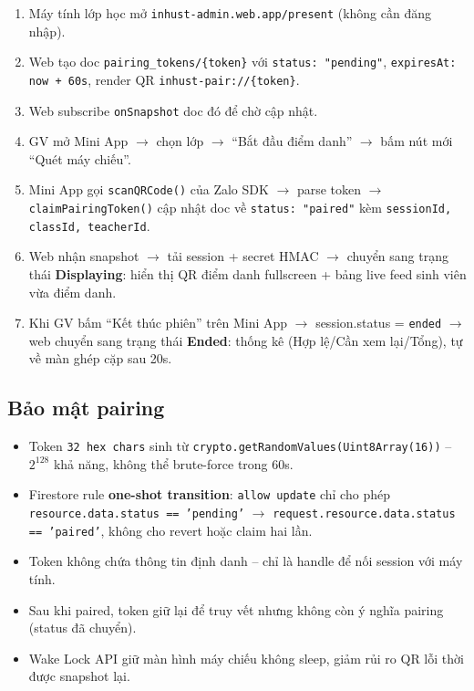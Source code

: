 \documentclass{article}
\begin{document}
\begin{enumerate}[leftmargin=1.5em]
  \item Máy tính lớp học mở \texttt{inhust-admin.web.app/present} (không cần đăng nhập).
  \item Web tạo doc \texttt{pairing\_tokens/\{token\}} với \texttt{status: "pending"}, \texttt{expiresAt: now + 60s}, render QR \texttt{inhust-pair://\{token\}}.
  \item Web subscribe \texttt{onSnapshot} doc đó để chờ cập nhật.
  \item GV mở Mini App $\to$ chọn lớp $\to$ ``Bắt đầu điểm danh'' $\to$ bấm nút mới ``Quét máy chiếu''.
  \item Mini App gọi \texttt{scanQRCode()} của Zalo SDK $\to$ parse token $\to$ \texttt{claimPairingToken()} cập nhật doc về \texttt{status: "paired"} kèm \texttt{sessionId, classId, teacherId}.
  \item Web nhận snapshot $\to$ tải session + secret HMAC $\to$ chuyển sang trạng thái \textbf{Displaying}: hiển thị QR điểm danh fullscreen + bảng live feed sinh viên vừa điểm danh.
  \item Khi GV bấm ``Kết thúc phiên'' trên Mini App $\to$ session.status = \texttt{ended} $\to$ web chuyển sang trạng thái \textbf{Ended}: thống kê (Hợp lệ/Cần xem lại/Tổng), tự về màn ghép cặp sau 20s.
\end{enumerate}

\subsection{Bảo mật pairing}

\begin{itemize}[leftmargin=1.5em]
  \item Token \texttt{32 hex chars} sinh từ \texttt{crypto.getRandomValues(Uint8Array(16))} -- $2^{128}$ khả năng, không thể brute-force trong 60s.
  \item Firestore rule \textbf{one-shot transition}: \texttt{allow update} chỉ cho phép \texttt{resource.data.status == 'pending'} $\to$ \texttt{request.resource.data.status == 'paired'}, không cho revert hoặc claim hai lần.
  \item Token không chứa thông tin định danh -- chỉ là handle để nối session với máy tính.
  \item Sau khi paired, token giữ lại để truy vết nhưng không còn ý nghĩa pairing (status đã chuyển).
  \item Wake Lock API giữ màn hình máy chiếu không sleep, giảm rủi ro QR lỗi thời được snapshot lại.
\end{itemize}
\end{document}
